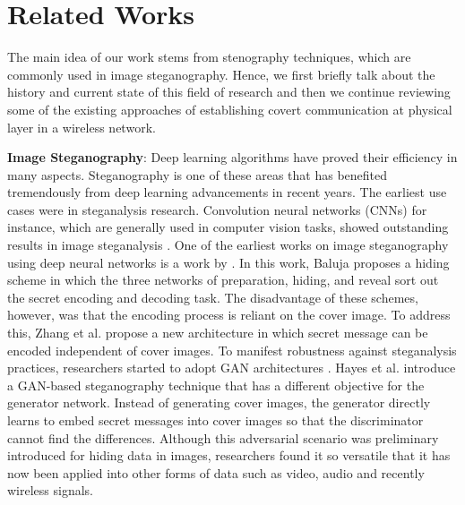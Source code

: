 \section{Related Works}
\label{s:related}
The main idea of our work stems from stenography techniques, which are commonly used in image steganography. Hence, we first briefly talk about the history and current state of this field of research and then we continue reviewing some of the existing approaches of establishing covert communication at physical layer in a wireless network.


\textbf{Image Steganography}: Deep learning algorithms have proved their efficiency in many aspects. Steganography is one of these areas that has benefited tremendously from deep learning advancements in recent years. The earliest use cases were in steganalysis research. Convolution neural networks (CNNs) for instance, which are generally used in computer vision tasks, showed outstanding results in image steganalysis \cite{tan2014stacked,qian2015deep,xu2016structural}. One of the earliest works on image steganography using deep neural networks is a work by \cite{baluja2017hiding}. In this work, Baluja proposes a hiding scheme in which the three networks of preparation, hiding, and reveal sort out the secret encoding and decoding task. The disadvantage of these schemes, however, was that the encoding process is reliant on the cover image. To address this, Zhang et al. \cite{zhang2020udh} propose a new architecture in which secret message can be encoded independent of cover images. To manifest robustness against steganalysis practices, researchers started to adopt GAN architectures \cite{goodfellow2014generative}. Hayes et al. \cite{hayes2017generating} introduce a GAN-based steganography technique that has a different objective for the generator network. Instead of generating cover images, the generator directly learns to embed secret messages into cover images so that the discriminator cannot find the differences. Although this adversarial scenario was preliminary introduced for hiding data in images, researchers found it so versatile that it has now been applied into other forms of data such as video, audio and recently wireless signals.


